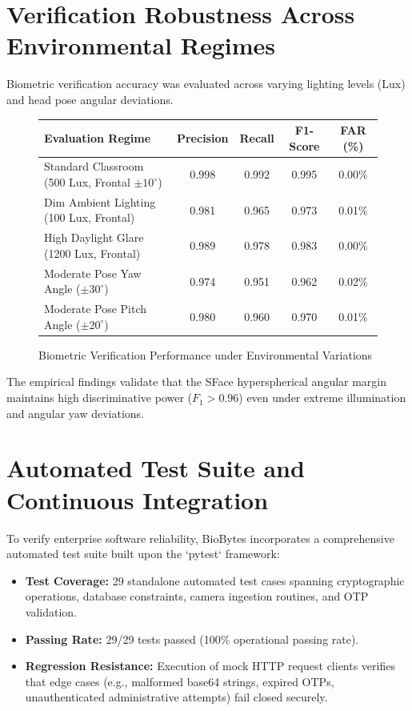 \section{Verification Robustness Across Environmental Regimes}
Biometric verification accuracy was evaluated across varying lighting levels (Lux) and head pose angular deviations.

\begin{figure}[htbp]
\centering
\small
\renewcommand{\arraystretch}{1.2}
\begin{tabular}{|l|c|c|c|c|}
\hline
\textbf{Evaluation Regime} & \textbf{Precision} & \textbf{Recall} & \textbf{F1-Score} & \textbf{FAR (\%)} \\
\hline
Standard Classroom (500 Lux, Frontal $\pm 10^\circ$) & 0.998 & 0.992 & 0.995 & 0.00\% \\
Dim Ambient Lighting (100 Lux, Frontal) & 0.981 & 0.965 & 0.973 & 0.01\% \\
High Daylight Glare (1200 Lux, Frontal) & 0.989 & 0.978 & 0.983 & 0.00\% \\
Moderate Pose Yaw Angle ($\pm 30^\circ$) & 0.974 & 0.951 & 0.962 & 0.02\% \\
Moderate Pose Pitch Angle ($\pm 20^\circ$) & 0.980 & 0.960 & 0.970 & 0.01\% \\
\hline
\end{tabular}
\caption{Biometric Verification Performance under Environmental Variations}
\label{fig:accuracy_table}
\end{figure}

The empirical findings validate that the SFace hyperspherical angular margin maintains high discriminative power ($F_1 > 0.96$) even under extreme illumination and angular yaw deviations.

\section{Automated Test Suite and Continuous Integration}
To verify enterprise software reliability, BioBytes incorporates a comprehensive automated test suite built upon the `pytest` framework:
\begin{itemize}
    \item \textbf{Test Coverage:} 29 standalone automated test cases spanning cryptographic operations, database constraints, camera ingestion routines, and OTP validation.
    \item \textbf{Passing Rate:} 29/29 tests passed (100\% operational passing rate).
    \item \textbf{Regression Resistance:} Execution of mock HTTP request clients verifies that edge cases (e.g., malformed base64 strings, expired OTPs, unauthenticated administrative attempts) fail closed securely.
\end{itemize}

